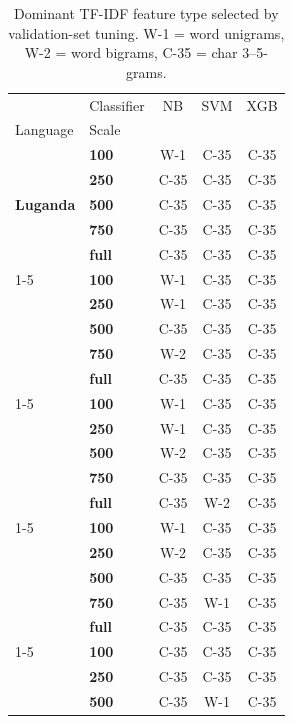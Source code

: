 \begin{table}[t]
\caption{Dominant TF-IDF feature type selected by validation-set tuning. W-1 = word unigrams, W-2 = word bigrams, C-35 = char 3--5-grams.}
\label{tab:feature_wins}
\begin{tabular}{llccc}
\toprule
 & Classifier & NB & SVM & XGB \\
Language & Scale &  &  &  \\
\midrule
\multirow[t]{5}{*}{\textbf{Luganda}} & \textbf{100} & W-1 & C-35 & C-35 \\
\textbf{} & \textbf{250} & C-35 & C-35 & C-35 \\
\textbf{} & \textbf{500} & C-35 & C-35 & C-35 \\
\textbf{} & \textbf{750} & C-35 & C-35 & C-35 \\
\textbf{} & \textbf{full} & C-35 & C-35 & C-35 \\
\cline{1-5}
\multirow[t]{5}{*}{\textbf{Rundi}} & \textbf{100} & W-1 & C-35 & C-35 \\
\textbf{} & \textbf{250} & W-1 & C-35 & C-35 \\
\textbf{} & \textbf{500} & C-35 & C-35 & C-35 \\
\textbf{} & \textbf{750} & W-2 & C-35 & C-35 \\
\textbf{} & \textbf{full} & C-35 & C-35 & C-35 \\
\cline{1-5}
\multirow[t]{5}{*}{\textbf{chiShona}} & \textbf{100} & W-1 & C-35 & C-35 \\
\textbf{} & \textbf{250} & W-1 & C-35 & C-35 \\
\textbf{} & \textbf{500} & W-2 & C-35 & C-35 \\
\textbf{} & \textbf{750} & C-35 & C-35 & C-35 \\
\textbf{} & \textbf{full} & C-35 & W-2 & C-35 \\
\cline{1-5}
\multirow[t]{5}{*}{\textbf{Kiswahili}} & \textbf{100} & W-1 & C-35 & C-35 \\
\textbf{} & \textbf{250} & W-2 & C-35 & C-35 \\
\textbf{} & \textbf{500} & C-35 & C-35 & C-35 \\
\textbf{} & \textbf{750} & C-35 & W-1 & C-35 \\
\textbf{} & \textbf{full} & C-35 & C-35 & C-35 \\
\cline{1-5}
\multirow[t]{5}{*}{\textbf{Amharic}} & \textbf{100} & C-35 & C-35 & C-35 \\
\textbf{} & \textbf{250} & C-35 & C-35 & C-35 \\
\textbf{} & \textbf{500} & C-35 & W-1 & C-35 \\

\end{tabular}
\end{table}
